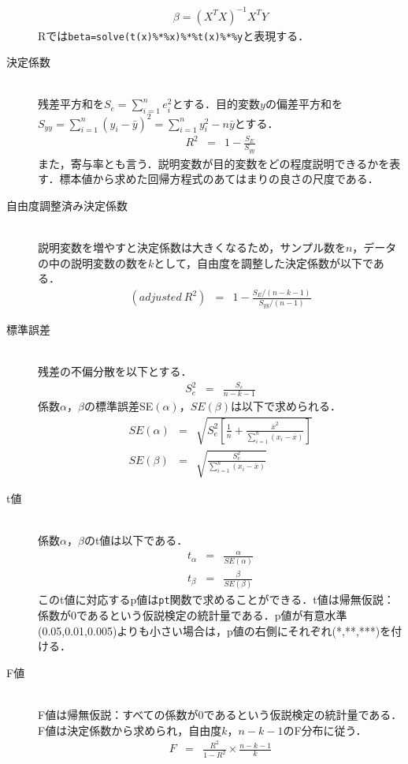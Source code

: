 \documentclass[a4paper,10pt,fleqn]{jarticle}
\begin{document}
\begin{description}
\begin{eqnarray*}
\beta=(X^T X)^{-1}X^T Y
\end{eqnarray*}
Rでは\verb+beta=solve(t(x)%*%x)%*%t(x)%*%y+と表現する．
\item[決定係数]\mbox{}\\
残差平方和を$S_e=\sum \limits^n _{i=1} e_i^2$とする．目的変数$y$の偏差平方和を$S_{yy}=\sum \limits^n _{i=1}\left( y_i -\bar{y} \right)^2=\sum \limits^n _{i=1}y_i^2-n\bar{y}$とする．
\begin{eqnarray*}
R^2&=&1-\frac{S_E}{S_{yy}}
\end{eqnarray*}
また，寄与率とも言う．説明変数が目的変数をどの程度説明できるかを表す．標本値から求めた回帰方程式のあてはまりの良さの尺度である．
\item[自由度調整済み決定係数]\mbox{}\\
説明変数を増やすと決定係数は大きくなるため，サンプル数を$n$，データの中の説明変数の数を$k$として，自由度を調整した決定係数が以下である．
\begin{eqnarray*}
(adjusted\ R^2)&=&1-\frac{S_E /(n-k-1)}{S_{yy} /(n-1)}
\end{eqnarray*}
\item[標準誤差]\mbox{}\\
残差の不偏分散を以下とする．
\begin{eqnarray*}
S_e^2&=&\frac{S_e}{n-k-1}
\end{eqnarray*}
係数$\alpha$，$\beta$の標準誤差SE$(\alpha)$，$SE(\beta)$は以下で求められる．
\begin{eqnarray*}
SE(\alpha)&=&\sqrt{S_e^2 \left[\frac{1}{n}+\frac{\bar{x}^2}{\sum \limits ^n _{i=1}\left( x_i-\bar{x} \right)}\right]}\\
SE(\beta)&=&\sqrt{\frac{S_e^2}{\sum \limits ^n _{i=1}\left( x_i-\bar{x} \right)}}
\end{eqnarray*}
\item[t値]\mbox{}\\
係数$\alpha$，$\beta$のt値は以下である．
\begin{eqnarray*}
t_\alpha &=&\frac{\alpha}{SE(\alpha)}\\
t_\beta &=&\frac{\beta}{SE(\beta)}
\end{eqnarray*}
このt値に対応するp値は{\tt pt}関数で求めることができる．t値は帰無仮説：係数が0であるという仮説検定の統計量である．p値が有意水準(0.05,0.01,0.005)よりも小さい場合は，p値の右側にそれぞれ(*,**,***)を付ける．
\item[F値]\mbox{}\\
F値は帰無仮説：すべての係数が0であるという仮説検定の統計量である．F値は決定係数から求められ，自由度$k$，$n-k-1$のF分布に従う．
\begin{eqnarray*}
F&=&\frac{R^2}{1-R^2}\times\frac{n-k-1}{k}
\end{eqnarray*}
\end{description}
\end{document}
